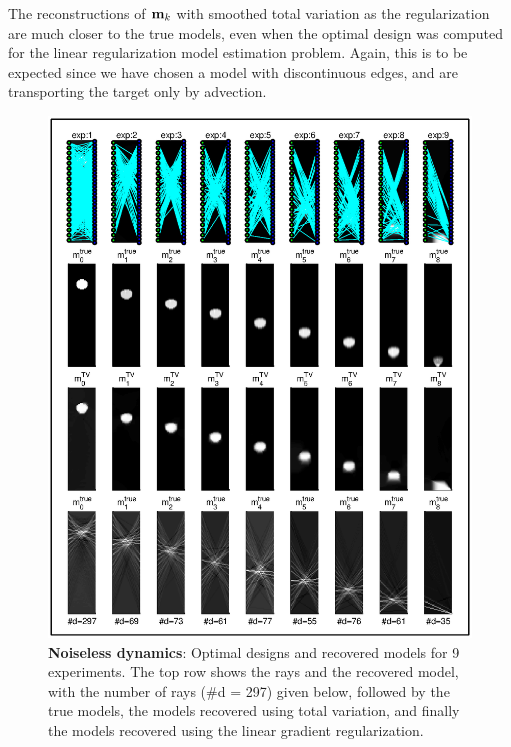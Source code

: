 \documentclass[final,leqno,onefignum,onetabnum]{siamltexmm}
\begin{document}
The reconstructions of ${\bf{m}}_k$ with smoothed total variation as the regularization are much closer to the true models, even when the optimal design was computed for the linear regularization model estimation problem. Again, this is to be expected since we have chosen a model with discontinuous edges, and are transporting the target only by advection. 
\begin{figure}
	\begin{center}
	\iwidth=160mm
	\includegraphics[width = 1\iwidth]{figures/noiselessFigs/noiselessResults.eps}
	\end{center}
	\caption{{\bf Noiseless dynamics}: Optimal designs and recovered models for 9 	experiments. The top row shows the rays and the recovered model, with 		the number of rays (\#d = 297) given below, followed by the true models, the models recovered using total variation, and finally the 	models recovered using the linear gradient regularization.}
	\label{fig:results1}
\end{figure}
%
%
%
\end{document}
